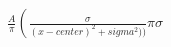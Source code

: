 \documentclass[10pt]{article}
\begin{document}
\begin{align*}\frac{A}{\pi} \left( \frac{\sigma}{(x - center)^2 + sigma^2)) } { \pi \sigma}
\end{align*}
\end{document}
